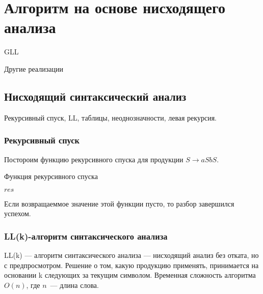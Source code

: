 \section{Алгоритм на основе нисходящего анализа}

GLL~\cite{Grigorev:2017:CPQ:3166094.3166104}

Другие реализации~\cite{MEDEIROS201975}

\subsection{Нисходящий синтаксический анализ}

Рекурсивный спуск, LL, таблицы, неоднозначности, левая рекурсия.

\subsubsection{Рекурсивный спуск}

\begin{example}
Постороим функцию рекурсивного спуска для продукции $S \rightarrow aSbS$.

\begin{algorithm}
\begin{algorithmic}[1]
\caption{Функция рекурсивного спуска}
    
    \EndIf
      
    \EndIf
    
    \State \Return $res$
\EndFunction

\end{algorithmic}
\end{algorithm}
\end{example}

Если возвращаеммое значение этой функции пусто, то разбор завершился успехом.

\subsubsection{LL(k)-алгоритм синтаксического анализа}

LL(k) --- алгоритм синтаксического анализа --- нисходящий анализ без отката, но с предпросмотром. 
Решение о том, какую продукцию применять, принимается на основании k следующих за текущим символом. 
Временная сложность алгоритма $O(n)$, где $n$~--- длина слова. 

